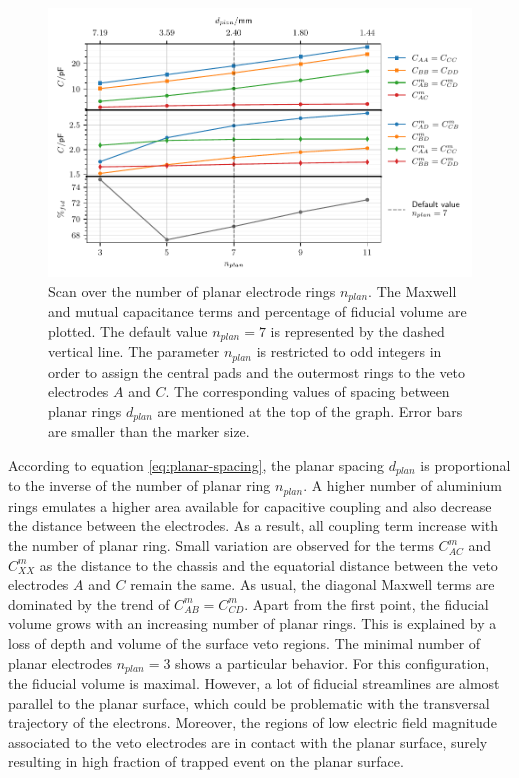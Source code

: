 \begin{figure}
\centering
\includegraphics[scale=1]{Figures/ElectrodesScan/capacitance_fiducial_n_top.pdf}
\caption{Scan over the number of planar electrode rings $n_{plan}$. The Maxwell and mutual capacitance terms and percentage of fiducial volume are plotted. The default value $n_{plan}=7$ is represented by the dashed vertical line. The parameter $n_{plan}$ is restricted to odd integers in order to assign the central pads and the outermost rings to the veto electrodes $A$ and $C$. The corresponding values of spacing between planar rings $d_{plan}$ are mentioned at the top of the graph. Error bars are smaller than the marker size.}
\label{fig:capacitance-fiducial-n-top}
\end{figure}

According to equation \ref{eq:planar-spacing}, the planar spacing $d_{plan}$ is proportional to the inverse of the number of planar ring $n_{plan}$. A higher number of aluminium rings emulates a higher area available for capacitive coupling and also decrease the distance between the electrodes. As a result, all coupling term increase with the number of planar ring. Small variation are observed for the terms $C_{AC}^m$ and $C_{XX}^m$ as the distance to the chassis  and the equatorial distance between the veto electrodes $A$ and $C$ remain the same. As usual, the diagonal Maxwell terms are dominated by the trend of $C_{AB}^m=C_{CD}^m$.
Apart from the first point, the fiducial volume grows with an increasing number of planar rings. This is explained by a loss of depth and volume of the surface veto regions. 
The minimal number of planar electrodes $n_{plan}=3$ shows a particular behavior. For this configuration, the fiducial volume is maximal. However, a lot of fiducial streamlines are almost parallel to the planar surface, which could be problematic with the transversal trajectory of the electrons. Moreover, the regions of low electric field magnitude associated to the veto electrodes are in contact with the planar surface, surely resulting in high fraction of trapped event on the planar surface. 

